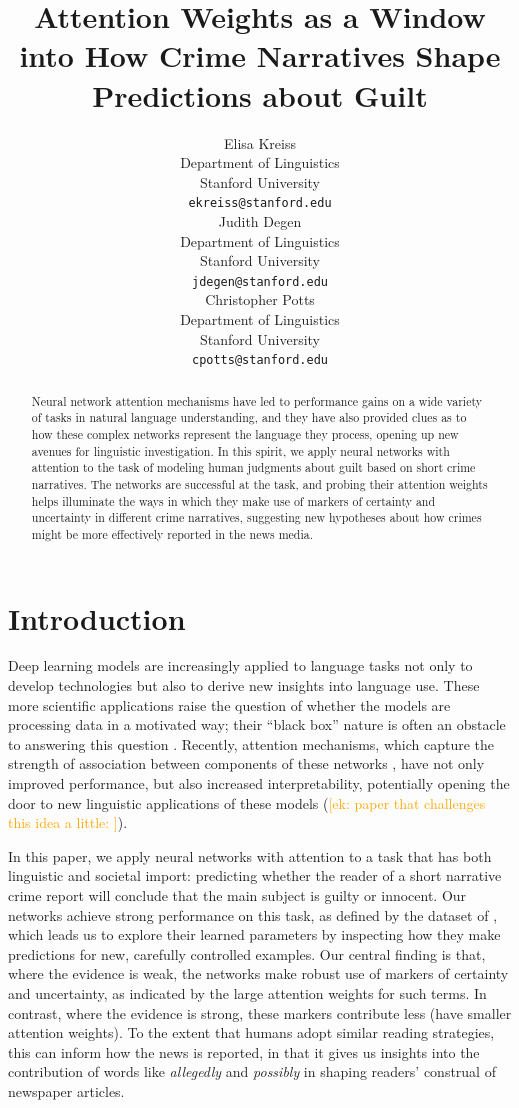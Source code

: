 \documentclass[11pt,a4paper]{article}
\title{Attention Weights as a Window into How Crime Narratives Shape Predictions about Guilt}
\author{Elisa Kreiss \\
  Department of Linguistics \\
  Stanford University \\
  \texttt{ekreiss@stanford.edu} \\\And
  Judith Degen \\
  Department of Linguistics \\
  Stanford University \\
  \texttt{jdegen@stanford.edu} \\\And
  Christopher Potts \\
  Department of Linguistics \\
  Stanford University \\
  \texttt{cpotts@stanford.edu}\\}
\date{}
\newcommand{\ek}[1]{\textcolor{Orange}{[ek: #1]}}
\begin{document}
\maketitle
\begin{abstract}
  Neural network attention mechanisms have led to performance gains on a wide variety of tasks in natural language understanding, and they have also provided clues as to how these complex networks represent the language they process, opening up new avenues for linguistic investigation. In this spirit, we apply neural networks with attention to the task of modeling human judgments about guilt based on short crime narratives. The networks are successful at the task, and probing their attention weights helps illuminate the ways in which they make use of markers of certainty and uncertainty in different crime narratives, suggesting new hypotheses about how crimes might be more effectively reported in the news media.
\end{abstract}

\section{Introduction}


Deep learning models are increasingly applied to language tasks not only to develop technologies but also to derive new insights into language use. These more scientific applications raise the question of whether the models are processing data in a motivated way; their ``black box'' nature is often an obstacle to answering this question \citep{Alishah-etal:2019}. Recently, attention mechanisms, which capture the strength of association between components of these networks \citep{bahdanau2014neural,luong-etal-2015-effective}, have not only improved performance, but also increased interpretability, potentially opening the door to new linguistic applications of these models (\ek{paper that challenges this idea a little: }\cite{Serrano:2019}).

In this paper, we apply neural networks with attention to a task that has both linguistic and societal import: predicting whether the reader of a short narrative crime report will conclude that the main subject is guilty or innocent. Our networks achieve strong performance on this task, as defined by the dataset of \citet{Kreiss:2019}, which leads us to explore their learned parameters by inspecting how they make predictions for new, carefully controlled examples. Our central finding is that, where the evidence is weak, the networks make robust use of markers of certainty and uncertainty, as indicated by the large attention weights for such terms. In contrast, where the evidence is strong, these markers contribute less (have smaller attention weights). To the extent that humans adopt similar reading strategies, this can inform how the news is reported, in that it gives us insights into the contribution of words like \emph{allegedly} and \emph{possibly} in shaping readers' construal of newspaper articles.
\end{document}
